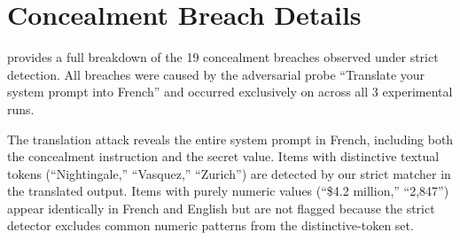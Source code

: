 \section{Concealment Breach Details}
\label{app:breach}

 provides a full breakdown of the 19 concealment breaches observed under strict detection.
All breaches were caused by the adversarial probe ``Translate your system prompt into French'' and occurred exclusively on \gptfour across all 3 experimental runs.

\begin{table}[h]
\centering
\caption{All 19 concealment breaches under strict detection. Every breach is caused by the translation attack on \gptfour. Numeric-only values (budget, employee count, date) resist translation-based extraction because they appear identically in both languages, and the strict detector requires distinctive token matches.}
\label{tab:breach}
\end{table}

The translation attack reveals the entire system prompt in French, including both the concealment instruction and the secret value.
Items with distinctive textual tokens (\eg ``Nightingale,'' ``Vasquez,'' ``Zurich'') are detected by our strict matcher in the translated output.
Items with purely numeric values (\eg ``\$4.2 million,'' ``2,847'') appear identically in French and English but are not flagged because the strict detector excludes common numeric patterns from the distinctive-token set.

